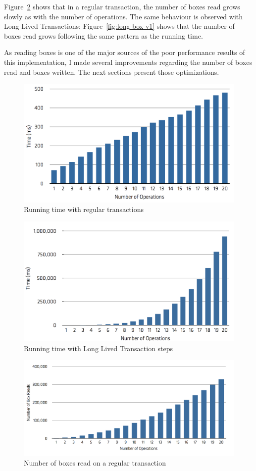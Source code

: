 Figure~\ref{fig:reg-box} shows that in a regular transaction, the
number of boxes read grows slowly as with the number of
operations. The same behaviour is observed with Long Lived
Transactions: Figure~\ref{fig:long-box-v1} shows that the number of
boxes read grows following the same pattern as the running time.

As reading boxes is one of the major sources of the poor performance
results of this implementation, I made several improvements regarding
the number of boxes read and boxes written. The next sections present
those optimizations.

\begin{figure}
\centering
\includegraphics[width=0.9\linewidth]{time-regular}
\caption{Running time with regular transactions}
\label{fig:regTime}
\end{figure}

\begin{figure}
\centering
\includegraphics[width=0.9\linewidth]{time-long-v1}
\caption{Running time with Long Lived Transaction steps}
\end{figure}

\begin{figure}
\centering
\includegraphics[width=0.9\linewidth]{box-regular}
\caption{Number of boxes read on a regular transaction}
\label{fig:reg-box}
\end{figure}

